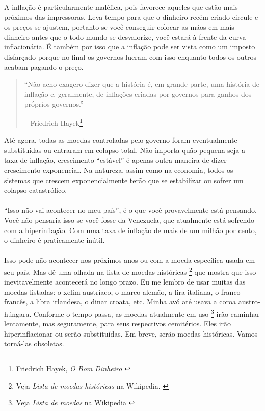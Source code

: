 A inflação é particularmente maléfica, pois favorece aqueles que estão mais próximos das impressoras. Leva tempo para que o dinheiro recém-criado circule e os preços se ajustem, portanto se você conseguir colocar as mãos em mais dinheiro antes que o todo mundo se desvalorize, você estará à frente da curva inflacionária. É também por isso que a inflação pode ser vista como um imposto disfarçado porque no final os governos lucram com isso enquanto todos os outros acabam pagando o preço.

\begin{quotation}\begin{samepage}
\enquote{Não acho exagero dizer que a história é, em grande parte, uma história de inflação e, geralmente, de inflações criadas por governos para ganhos dos próprios governos.}
\begin{flushright} -- Friedrich Hayek\footnote{Friedrich Hayek, \textit{O Bom Dinheiro} \cite{hayek-good-money}}
\end{flushright}\end{samepage}\end{quotation}

Até agora, todas as moedas controladas pelo governo foram eventualmente substituídas ou entraram em colapso total. Não importa quão pequena seja a taxa de inflação, crescimento \enquote{estável} é apenas outra maneira de dizer crescimento exponencial. Na natureza, assim como na economia, todos os sistemas que crescem exponencialmente terão que se estabilizar ou sofrer um colapso catastrófico.

\paragraph{}
\enquote{Isso não vai acontecer no meu país}, é o que você provavelmente está pensando. Você não pensaria isso se você fosse da Venezuela, que atualmente está sofrendo com a hiperinflação. Com uma taxa de inflação de mais de um milhão por cento, o dinheiro é praticamente inútil. \cite{wiki:venezuela}

\paragraph{}
Isso pode não acontecer nos próximos anos ou com a moeda específica usada em seu país. Mas dê uma olhada na lista de moedas históricas \footnote{Veja \textit{Lista de moedas históricas} na Wikipedia. \cite{wiki:historical-currencies}} que mostra que isso inevitavelmente acontecerá no longo prazo. Eu me lembro de usar muitas das moedas listadas: o xelim austríaco, o marco alemão, a lira italiana, o franco francês, a libra irlandesa, o dinar croata, etc. Minha avó até usava a coroa austro-húngara. Conforme o tempo passa, as moedas atualmente em uso \footnote{Veja \textit{Lista de moedas} na Wikipedia \cite{wiki:list-of-currencies}} irão caminhar lentamente, mas seguramente, para seus respectivos cemitérios. Eles irão hiperinflacionar ou serão substituídas. Em breve, serão moedas históricas. Vamos torná-las obsoletas.

